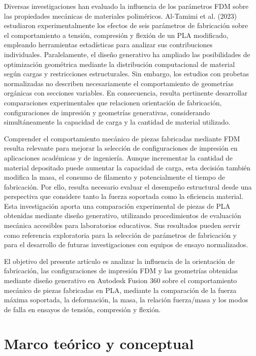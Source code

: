 \documentclass[10pt,twocolumn]{article}
\begin{document}
Diversas investigaciones han evaluado la influencia de los parámetros FDM sobre las propiedades mecánicas de materiales poliméricos. Al-Tamimi et al. (2023) estudiaron experimentalmente los efectos de seis parámetros de fabricación sobre el comportamiento a tensión, compresión y flexión de un PLA modificado, empleando herramientas estadísticas para analizar sus contribuciones individuales. Paralelamente, el diseño generativo ha ampliado las posibilidades de optimización geométrica mediante la distribución computacional de material según cargas y restricciones estructurales. Sin embargo, los estudios con probetas normalizadas no describen necesariamente el comportamiento de geometrías orgánicas con secciones variables. En consecuencia, resulta pertinente desarrollar comparaciones experimentales que relacionen orientación de fabricación, configuraciones de impresión y geometrías generativas, considerando simultáneamente la capacidad de carga y la cantidad de material utilizado.

Comprender el comportamiento mecánico de piezas fabricadas mediante FDM resulta relevante para mejorar la selección de configuraciones de impresión en aplicaciones académicas y de ingeniería. Aunque incrementar la cantidad de material depositado puede aumentar la capacidad de carga, esta decisión también modifica la masa, el consumo de filamento y potencialmente el tiempo de fabricación. Por ello, resulta necesario evaluar el desempeño estructural desde una perspectiva que considere tanto la fuerza soportada como la eficiencia material. Esta investigación aporta una comparación experimental de piezas de PLA obtenidas mediante diseño generativo, utilizando procedimientos de evaluación mecánica accesibles para laboratorios educativos. Sus resultados pueden servir como referencia exploratoria para la selección de parámetros de fabricación y para el desarrollo de futuras investigaciones con equipos de ensayo normalizados.

El objetivo del presente artículo es analizar la influencia de la orientación de fabricación, las configuraciones de impresión FDM y las geometrías obtenidas mediante diseño generativo en Autodesk Fusion 360 sobre el comportamiento mecánico de piezas fabricadas en PLA, mediante la comparación de la fuerza máxima soportada, la deformación, la masa, la relación fuerza/masa y los modos de falla en ensayos de tensión, compresión y flexión.
\section{Marco teórico y conceptual}
\end{document}
